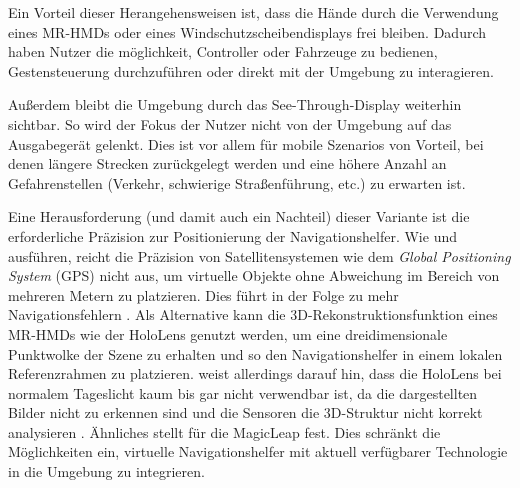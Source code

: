 Ein Vorteil dieser Herangehensweisen ist, dass die Hände durch die Verwendung eines MR-HMDs oder eines Windschutzscheibendisplays frei bleiben.
Dadurch haben Nutzer die möglichkeit, Controller oder Fahrzeuge zu bedienen, Gestensteuerung durchzuführen oder direkt mit der Umgebung zu interagieren.

Außerdem bleibt die Umgebung durch das See-Through-Display weiterhin sichtbar.
So wird der Fokus der Nutzer nicht von der Umgebung auf das Ausgabegerät gelenkt.
Dies ist vor allem für mobile Szenarios von Vorteil, bei denen längere Strecken zurückgelegt werden und eine höhere Anzahl an Gefahrenstellen (Verkehr, schwierige Straßenführung, etc.) zu erwarten ist.

Eine Herausforderung (und damit auch ein Nachteil) dieser Variante ist die erforderliche Präzision zur Positionierung der Navigationshelfer.
Wie \citeauthor{Wiesner2017} und \citeauthor{Pfannmueller2015} ausführen, reicht die Präzision von Satellitensystemen wie dem \emph{Global Positioning System} (GPS) nicht aus, um virtuelle Objekte ohne Abweichung im Bereich von mehreren Metern zu platzieren.
Dies führt in der Folge zu mehr Navigationsfehlern \parencites[378]{Wiesner2017}{Pfannmueller2015}.
Als Alternative kann die 3D-Rekonstruktionsfunktion eines MR-HMDs wie der HoloLens genutzt werden, um eine dreidimensionale Punktwolke der Szene zu erhalten und so den Navigationshelfer in einem lokalen Referenzrahmen zu platzieren.
\citeauthor{Schroeder2017} weist allerdings darauf hin, dass die HoloLens bei normalem Tageslicht kaum bis gar nicht verwendbar ist, da die dargestellten Bilder nicht zu erkennen sind und die Sensoren die 3D-Struktur nicht korrekt analysieren \parencite[47]{Schroeder2017}.
Ähnliches stellt \citeauthor{Strange2018} für die MagicLeap fest.
Dies schränkt die Möglichkeiten ein, virtuelle Navigationshelfer mit aktuell verfügbarer Technologie in die Umgebung zu integrieren.

